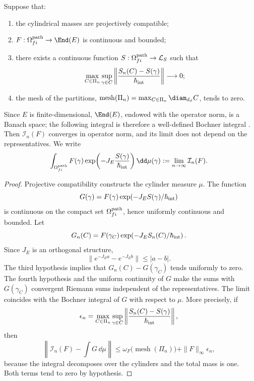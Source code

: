 \begin{theorem}
\label{thm:integral-cilindrica-limite}
Suppose that:
\begin{enumerate}
 \item the cylindrical masses are projectively compatible;
 \item \(F:\Omega_{fi}^{\rm path}\to\End(E)\) is continuous and bounded;
 \item there exists a continuous function
       \(S:\Omega_{fi}^{\rm path}\to\mathcal L_S\) such that
       \[
        \max_{C\in\Pi_n}\sup_{\gamma\in C}
        \left\|
          \frac{S_n(C)-S(\gamma)}{\hbar_{\rm int}}
        \right\|\longrightarrow0;
       \]
 \item the mesh of the partitions,
       \(\operatorname{mesh}(\Pi_n)
        =\max_{C\in\Pi_n}\diam_{d_\vartheta}C\),
       tends to zero.
\end{enumerate}
Since \(E\) is finite-dimensional, \(\End(E)\), endowed with the operator
norm, is a Banach space; the following integral is therefore a well-defined
Bochner integral \cite{Bochner1955}.
Then \(\mathcal I_n(F)\) converges in operator norm, and its limit does not
depend on the representatives. We write
\begin{equation}
 \int_{\Omega_{fi}^{\rm path}}
 F(\gamma)
 \exp\!\left(-J_E\frac{S(\gamma)}{\hbar_{\rm int}}\right)
 \dd\mu(\gamma)
 :=\lim_{n\to\infty}\mathcal I_n(F).
 \label{eq:integral-genealogica}
\end{equation}
\end{theorem}

\begin{proof}
Projective compatibility constructs the cylinder measure \(\mu\). The
function
\[
 G(\gamma)=F(\gamma)
 \exp\!\left(-J_E S(\gamma)/\hbar_{\rm int}\right)
\]
is continuous on the compact set \(\Omega_{fi}^{\rm path}\), hence uniformly
continuous and bounded. Let
\[
 G_n(C)=F(\gamma_C)
 \exp\!\left(-J_E S_n(C)/\hbar_{\rm int}\right).
\]
Since \(J_E\) is an orthogonal structure,
\[
 \|e^{-J_Ea}-e^{-J_Eb}\|\leq |a-b|.
\]
The third hypothesis implies that
\(G_n(C)-G(\gamma_C)\) tends uniformly to zero. The fourth hypothesis and the
uniform continuity of \(G\) make the sums with \(G(\gamma_C)\)
convergent Riemann sums independent of the representatives. The
limit coincides with the Bochner integral of \(G\) with respect to \(\mu\).
More precisely, if
\[
 \epsilon_n
 =\max_{C\in\Pi_n}\sup_{\gamma\in C}
   \left\|
    \frac{S_n(C)-S(\gamma)}{\hbar_{\rm int}}
   \right\|,
\]
then
\[
 \left\|\mathcal I_n(F)-\int G\,\dd\mu\right\|
 \leq
 \omega_F\!\bigl(\operatorname{mesh}(\Pi_n)\bigr)
 +\|F\|_\infty\epsilon_n,
\]
because the integral decomposes over the cylinders and the total mass is one.
Both terms tend to zero by hypothesis.
\end{proof}


